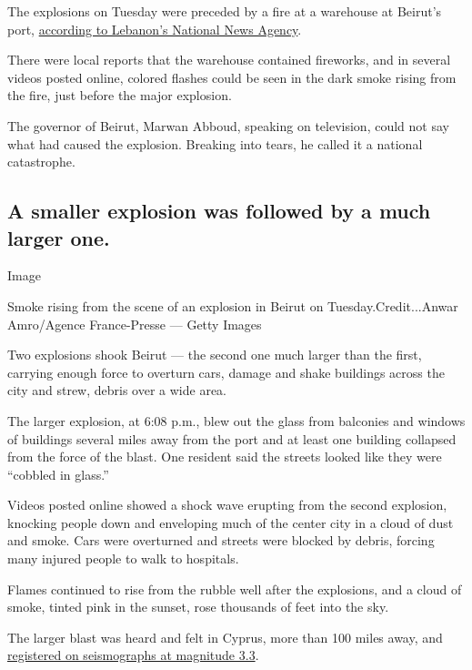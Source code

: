 The explosions on Tuesday were preceded by a fire at a warehouse at
Beirut's port,
\href{http://nna-leb.gov.lb/en/show-news/118492/Fire-breaks-out-in-warehouse-at-Port-of-Beirut-causes-major-explosion}{according
to Lebanon's National News Agency}.

There were local reports that the warehouse contained fireworks, and in
several videos posted online, colored flashes could be seen in the dark
smoke rising from the fire, just before the major explosion.

The governor of Beirut, Marwan Abboud, speaking on television, could not
say what had caused the explosion. Breaking into tears, he called it a
national catastrophe.

\hypertarget{a-smaller-explosion-was-followed-by-a-much-larger-one}{%
\subsection{A smaller explosion was followed by a much larger
one.}\label{a-smaller-explosion-was-followed-by-a-much-larger-one}}

Image

Smoke rising from the scene of an explosion in Beirut on
Tuesday.Credit...Anwar Amro/Agence France-Presse --- Getty Images

Two explosions shook Beirut --- the second one much larger than the
first, carrying enough force to overturn cars, damage and shake
buildings across the city and strew, debris over a wide area.

The larger explosion, at 6:08 p.m., blew out the glass from balconies
and windows of buildings several miles away from the port and at least
one building collapsed from the force of the blast. One resident said
the streets looked like they were ``cobbled in glass.''

Videos posted online showed a shock wave erupting from the second
explosion, knocking people down and enveloping much of the center city
in a cloud of dust and smoke. Cars were overturned and streets were
blocked by debris, forcing many injured people to walk to hospitals.

Flames continued to rise from the rubble well after the explosions, and
a cloud of smoke, tinted pink in the sunset, rose thousands of feet into
the sky.

The larger blast was heard and felt in Cyprus, more than 100 miles away,
and
\href{https://www.emsc-csem.org/Earthquake/earthquake.php?id=882410\#summary}{registered
on seismographs at magnitude 3.3}.

